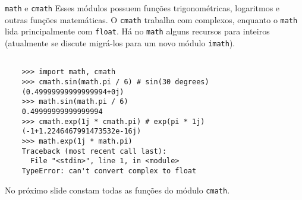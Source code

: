 \documentclass[utf8]{beamer}
\begin{document}
\begin{frame}[fragile]{\texttt{math} e \texttt{cmath}}
  Esses módulos possuem funções trigonométricas, logaritmos
  e outras funções matemáticas.
  O \texttt{cmath} trabalha com complexos, enquanto o
  \texttt{math} lida principalmente com
  \texttt{float}.
  Há no \texttt{math} alguns recursos para inteiros
  (atualmente se discute migrá-los para um novo módulo
  \texttt{imath}).

  \begin{verbatim}

    >>> import math, cmath
    >>> cmath.sin(math.pi / 6) # sin(30 degrees)
    (0.49999999999999994+0j)
    >>> math.sin(math.pi / 6)
    0.49999999999999994
    >>> cmath.exp(1j * cmath.pi) # exp(pi * 1j)
    (-1+1.2246467991473532e-16j)
    >>> math.exp(1j * math.pi)
    Traceback (most recent call last):
      File "<stdin>", line 1, in <module>
    TypeError: can't convert complex to float

  \end{verbatim}

  No próximo slide constam todas as funções do
  módulo \texttt{cmath}.

\end{frame}
\end{document}
